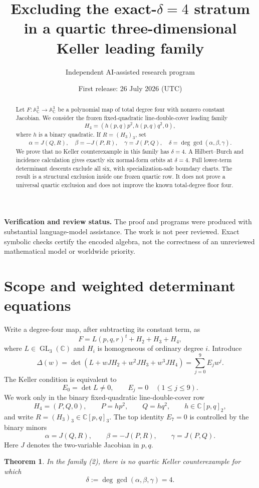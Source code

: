 \documentclass[11pt]{article}
\title{\textbf{Excluding the exact-\(\delta=4\) stratum}\\
\large in a quartic three-dimensional Keller leading family}
\author{Independent AI-assisted research program}
\date{First release: 26 July 2026 (UTC)}
\newtheorem{theorem}{Theorem}
\newcommand{\C}{\mathbb C}
\newcommand{\A}{\mathbb A}
\begin{document}
\maketitle

\begin{abstract}
Let \(F:\A^3_{\C}\to\A^3_{\C}\) be a polynomial map of total degree
four with nonzero constant Jacobian.  We consider the frozen
fixed-quadratic line-double-cover leading family
\[
H_4=(h(p,q)p^2,h(p,q)q^2,0),
\]
where \(h\) is a binary quadratic.  If \(R=(H_3)_3\), set
\[
\alpha=J(Q,R),\quad \beta=-J(P,R),\quad \gamma=J(P,Q),\quad
\delta=\deg\gcd(\alpha,\beta,\gamma).
\]
We prove that no Keller counterexample in this family has
\(\delta=4\).  A Hilbert--Burch and incidence calculation gives exactly
six normal-form orbits at \(\delta=4\).  Full lower-term determinant
descents exclude all six, with specialization-safe boundary charts.
The result is a structural exclusion inside one frozen quartic row.  It
does not prove a universal quartic exclusion and does not improve the
known total-degree floor four.
\end{abstract}

\noindent\textbf{Verification and review status.}
The proof and programs were produced with substantial language-model
assistance.  The work is not peer reviewed.  Exact symbolic checks certify
the encoded algebra, not the correctness of an unreviewed mathematical
model or worldwide priority.

\section{Scope and weighted determinant equations}

Write a degree-four map, after subtracting its constant term, as
\[
F=L(p,q,r)^t+H_2+H_3+H_4,
\]
where \(L\in\operatorname{GL}_3(\C)\) and \(H_i\) is homogeneous of
ordinary degree \(i\).  Introduce
\[
\Delta(w)=\det\left(L+wJH_2+w^2JH_3+w^3JH_4\right)
          =\sum_{j=0}^9 E_jw^j.
\]
The Keller condition is equivalent to
\[
E_0=\det L\ne0,\qquad E_j=0\quad(1\le j\le9).
\tag{1}
\]
We work only in the binary fixed-quadratic line-double-cover row
\[
H_4=(P,Q,0),\qquad P=hp^2,\qquad Q=hq^2,\qquad
h\in\C[p,q]_2,
\tag{2}
\]
and write \(R=(H_3)_3\in\C[p,q]_3\).  The top identity \(E_7=0\)
is controlled by the binary minors
\[
\alpha=J(Q,R),\qquad \beta=-J(P,R),\qquad \gamma=J(P,Q).
\tag{3}
\]
Here \(J\) denotes the two-variable Jacobian in \(p,q\).

\begin{theorem}\label{thm:main}
In the family \emph{(2)}, there is no quartic Keller counterexample for
which
\[
\delta:=\deg\gcd(\alpha,\beta,\gamma)=4.
\]
\end{theorem}
\end{document}
